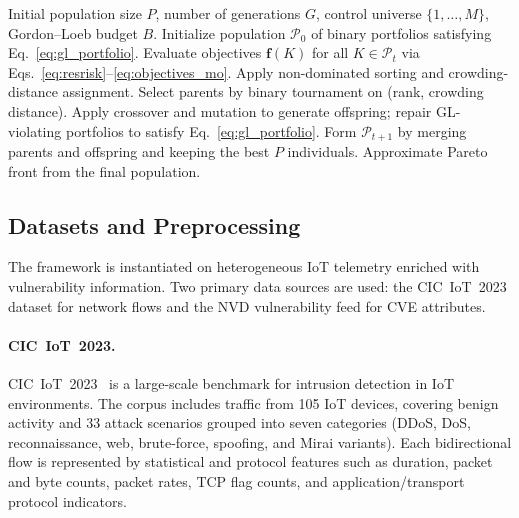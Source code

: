 \documentclass[preprint,12pt]{elsarticle}
\begin{document}
\begin{algorithm}[H]
\caption{NSGA--II as a downstream portfolio-comparison procedure under the Gordon--Loeb bound}
\label{alg:nsgaii}
\begin{algorithmic}[1]
\Require Initial population size $P$, number of generations $G$, control universe $\{1,\dots,M\}$, Gordon--Loeb budget $B$.
\State Initialize population $\mathcal{P}_0$ of binary portfolios satisfying Eq.~\eqref{eq:gl_portfolio}.
  \State Evaluate objectives $\mathbf{f}(K)$ for all $K\in\mathcal{P}_t$ via Eqs.~\eqref{eq:resrisk}--\eqref{eq:objectives_mo}.
  \State Apply non-dominated sorting and crowding-distance assignment.
  \State Select parents by binary tournament on (rank, crowding distance).
  \State Apply crossover and mutation to generate offspring; repair GL-violating portfolios to satisfy Eq.~\eqref{eq:gl_portfolio}.
  \State Form $\mathcal{P}_{t+1}$ by merging parents and offspring and keeping the best $P$ individuals.
\EndFor
\State \Return Approximate Pareto front from the final population.
\end{algorithmic}
\end{algorithm}


\subsection{Datasets and Preprocessing}
\label{sec:dataset}

The framework is instantiated on heterogeneous IoT telemetry enriched with vulnerability information. Two primary data sources are used: the CIC~IoT~2023 dataset for network flows and the NVD vulnerability feed for CVE attributes.

\paragraph{CIC~IoT~2023.}
CIC~IoT~2023~\cite{Neto2023_CICIoT2023,CICIoT2023_Web} is a large-scale benchmark for intrusion detection in IoT environments. The corpus includes traffic from 105 IoT devices, covering benign activity and 33 attack scenarios grouped into seven categories (DDoS, DoS, reconnaissance, web, brute-force, spoofing, and Mirai variants). Each bidirectional flow is represented by statistical and protocol features such as duration, packet and byte counts, packet rates, TCP flag counts, and application/transport protocol indicators.
\end{document}

